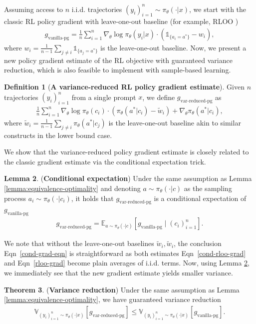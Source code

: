 \documentclass{article}
\theoremstyle{definition}
\newtheorem{theorem}{Theorem}
\newtheorem{definition}[theorem]{Definition}
\newtheorem{lemma}[theorem]{Lemma}
\begin{document}
Assuming access to $n$ i.i.d. trajectories $(y_i)_{i=1}^n\sim \pi_\theta(\cdot|x)$, we start with the classic RL policy gradient with leave-one-out baseline (for example, RLOO \citep{rloo})
\begin{align}
\label{rloo-grad}
g_\text{vanilla-pg} = \frac{1}{n} \sum_{i=1}^n \nabla_\theta\log\pi_\theta(y_i|x) \cdot \left(\mathds{1}_{\{a_i=a^*\}} - w_i\right), 
\end{align}
where $w_i=\frac{1}{n - 1}\sum_{j\neq i} \mathds{1}_{\{a_j = a^*\}}$ is the leave-one-out baseline. Now, we present a new policy gradient estimate of the RL objective with guaranteed variance reduction, which is also feasible to implement with sample-based learning.


\begin{definition}[\textbf{A variance-reduced RL policy gradient estimate}]
Given $n$ trajectories $(y_i)_{i=1}^n$ from a single prompt $x$, we define $g_\text{var-reduced-pg}$ as
\begin{align}
\label{cond-rloo-grad}
\frac{1}{n}\sum_{i=1}^n  \nabla_\theta \log\pi_\theta(c_i)\cdot (\pi_\theta(a^*|c_i) - \tilde{w}_i) +  \nabla_\theta \pi_\theta(a^*|c_i),
\end{align}
where $\tilde{w}_i = \frac{1}{n - 1}\sum_{j\neq i} \pi_\theta(a^* | c_j)$ is the leave-one-out baseline akin to similar constructs in the lower bound case.
\end{definition}

We show that the variance-reduced policy gradient estimate is closely related to the classic gradient estimate via the conditional expectation trick.
\begin{lemma} \label{cond-grad-lemma} (\textbf{Conditional expectation})
Under the same assumption as Lemma \ref{lemma:equivalence-optimality} and denoting $a\sim \pi_\theta(\cdot|c)$ as the sampling process $a_i\sim \pi_\theta(\cdot|c_i)$, it holds that $g_\text{var-reduced-pg}$ is a conditional expectation of $g_\text{vanilla-pg}$
\begin{align}
\label{cond-grad-eqn}
g_\text{var-reduced-pg} = \mathbb{E}_{a\sim \pi_\theta(\cdot|c)} \left[g_\text{vanilla-pg} \;|\; (c_i)_{i=1}^n\right].
\end{align}
\end{lemma}
We note that without the leave-one-out baselines $\tilde{w}_i,\tilde{w}_i$, the conclusion Eqn~\eqref{cond-grad-eqn} is straightforward as both estimates Eqn~\eqref{cond-rloo-grad} and Eqn~\eqref{rloo-grad} become plain averages of i.i.d. terms. Now, using Lemma \ref{cond-grad-lemma}, we immediately see that the new gradient estimate yields smaller variance.
\begin{theorem} (\textbf{Variance reduction})
Under the same assumption as Lemma \ref{lemma:equivalence-optimality}, we have guaranteed variance reduction
\begin{align}
\label{var-red}
\mathbb{V}_{(y_i)_{i=1}^n\sim\pi_\theta(\cdot|x)} \left[g_\text{var-reduced-pg}\right] \le \mathbb{V}_{(y_i)_{i=1}^n\sim\pi_\theta(\cdot|x)} \left[g_\text{vanilla-pg}\right].
\end{align}
\end{theorem}
\end{document}

